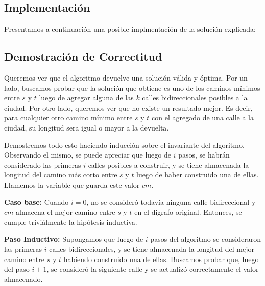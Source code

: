 \subsection{Implementación}
\vspace{1em}

Presentamos a continuación una posible implmentación de la solución explicada:



\subsection{Demostración de Correctitud}
\vspace{1em}

Queremos ver que el algoritmo devuelve una solución válida y óptima. Por un lado, buscamos probar que la solución que obtiene es uno de los caminos mínimos entre $s$ y $t$ luego de agregar alguna de las $k$ calles bidireccionales posibles a la ciudad. Por otro lado, queremos ver que no existe un resultado mejor. Es decir, para cualquier otro camino mínimo entre $s$ y $t$ con el agregado de una calle a la ciudad, su longitud sera igual o mayor a la devuelta.

\vspace{1em}

Demostremos todo esto haciendo inducción sobre el invariante del algoritmo. Observando el mismo, se puede apreciar que luego de $i$ pasos, se habrán considerado las primeras $i$ calles posibles a construir, y se tiene almacenada la longitud del camino más corto entre $s$ y $t$ luego de haber construido una de ellas. Llamemos la variable que guarda este valor $cm$. 

\vspace{1em}

\textbf{Caso base:} Cuando $i = 0$, no se consideró todavía ninguna calle bidireccional y $cm$ almacena el mejor camino entre $s$ y $t$ en el digrafo original. Entonces, se cumple triviálmente la hipótesis inductiva.

\vspace{1em}

\textbf{Paso Inductivo:} Supongamos que luego de $i$ pasos del algoritmo se consideraron las primeras $i$ calles bidireccionales, y se tiene almacenada la longitud del mejor camino entre $s$ y $t$ habiendo construido una de ellas. Buscamos probar que, luego del paso $i+1$, se consideró la siguiente calle y se actualizó correctamente el valor almacenado.

